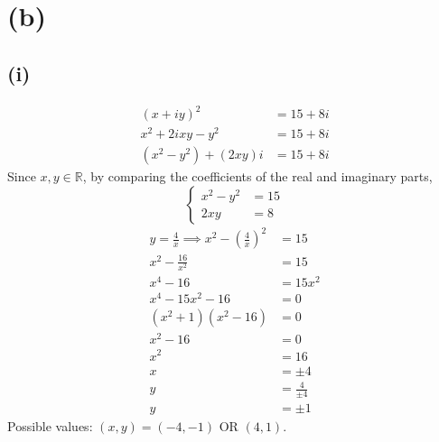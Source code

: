 \documentclass[12pt,a4paper]{article}
\begin{document}
\section*{(b)}
\subsection*{(i)}
\[\begin{aligned}
    (x+iy)^2&=15+8i\\
	x^2+2ixy-y^2&=15+8i\\
	\left(x^2-y^2\right)+(2xy)i&=15+8i
\end{aligned}\]
Since \(x,y\in\mathbb R\), by comparing the coefficients of the real and imaginary parts,
\[\begin{cases}
	x^2-y^2&=15\\
	2xy&=8
\end{cases}\]
\[\begin{aligned}
	y=\frac4x\implies x^2-\left(\frac4x\right)^2&=15\\
	x^2-\frac{16}{x^2}&=15\\
	x^4-16&=15x^2\\
	x^4-15x^2-16&=0\\
	\left(x^2+1\right)\left(x^2-16\right)&=0\\
	x^2-16&=0\\
	x^2&=16\\
	x&=\pm4\\
	y&=\frac4{\pm4}\\
	y&=\pm1
\end{aligned}\]
Possible values: \((x,y)=\boxed{(-4,-1)}\text{ OR }\boxed{(4,1)}\).
\end{document}

